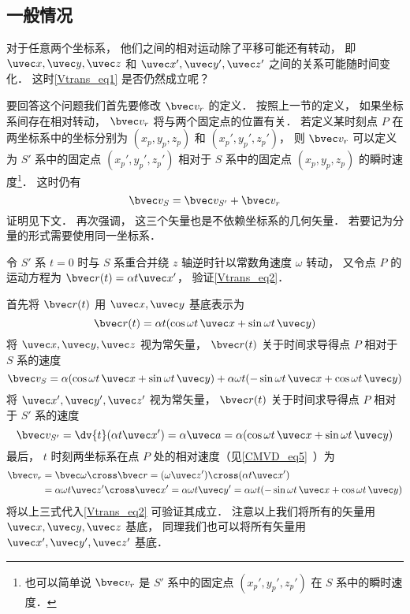 \subsection{一般情况}
对于任意两个坐标系， 他们之间的相对运动除了平移可能还有转动， 即 $\uvec x, \uvec y, \uvec z$ 和 $\uvec x', \uvec y', \uvec z'$ 之间的关系可能随时间变化． 这时\autoref{Vtrans_eq1} 是否仍然成立呢？

要回答这个问题我们首先要修改 $\bvec v_r$ 的定义． 按照上一节的定义， 如果坐标系间存在相对转动， $\bvec v_r$ 将与两个固定点的位置有关． 若定义某时刻点 $P$ 在两坐标系中的坐标分别为 $(x_p, y_p, z_p)$ 和 $(x_p', y_p', z_p')$， 则 $\bvec v_r$ 可以定义为 $S'$ 系中的固定点 $(x_p', y_p', z_p')$ 相对于 $S$ 系中的固定点 $(x_p, y_p, z_p)$ 的瞬时速度\footnote{也可以简单说 $\bvec v_r$ 是 $S'$ 系中的固定点 $(x_p', y_p', z_p')$ 在 $S$ 系中的瞬时速度．}． 这时仍有
\begin{equation}\label{Vtrans_eq2}
\bvec v_{S} = \bvec v_{S'} + \bvec v_r
\end{equation}
证明见下文． 再次强调， 这三个矢量也是不依赖坐标系的几何矢量． 若要记为分量的形式需要使用同一坐标系．

\begin{example}{}\label{Vtrans_ex1}
令 $S'$ 系 $t = 0$ 时与 $S$ 系重合并绕 $z$ 轴逆时针以常数角速度 $\omega$ 转动， 又令点 $P$ 的运动方程为 $\bvec r(t) = \alpha t \uvec x'$， 验证\autoref{Vtrans_eq2}．

首先将 $\bvec r(t)$ 用 $\uvec x, \uvec y$ 基底表示为
\begin{equation}
\bvec r(t) = \alpha t (\cos\omega t\, \uvec x + \sin\omega t\, \uvec y)
\end{equation}
将 $\uvec x, \uvec y, \uvec z$ 视为常矢量， $\bvec r(t)$ 关于时间求导得点 $P$ 相对于 $S$ 系的速度
\begin{equation}
\bvec v_S = \alpha (\cos\omega t \,\uvec x + \sin\omega t \,\uvec y)
+ \alpha\omega t (-\sin\omega t \,\uvec x + \cos\omega t \,\uvec y)
\end{equation}
将 $\uvec x', \uvec y', \uvec z'$ 视为常矢量， $\bvec r(t)$ 关于时间求导得点 $P$ 相对于 $S'$ 系的速度
\begin{equation}
\bvec v_{S'} = \dv{t} (\alpha t \uvec x') = \alpha \uvec a = \alpha (\cos\omega t\, \uvec x + \sin\omega t \,\uvec y)
\end{equation}
最后， $t$ 时刻两坐标系在点 $P$ 处的相对速度（见\autoref{CMVD_eq5}~）为
\begin{equation}\label{Vtrans_eq3}
\begin{aligned}
\bvec v_r &= \bvec\omega \cross \bvec r = (\omega \uvec z') \cross (\alpha t \uvec x') \\
&= \alpha\omega t \uvec z'\cross\uvec x' = \alpha\omega t \uvec y' = \alpha\omega t(-\sin \omega t \,\uvec x + \cos\omega t \,\uvec y)
\end{aligned}
\end{equation}
将以上三式代入\autoref{Vtrans_eq2} 可验证其成立． 注意以上我们将所有的矢量用 $\uvec x, \uvec y, \uvec z$ 基底， 同理我们也可以将所有矢量用 $\uvec x', \uvec y', \uvec z'$ 基底．
\end{example}

